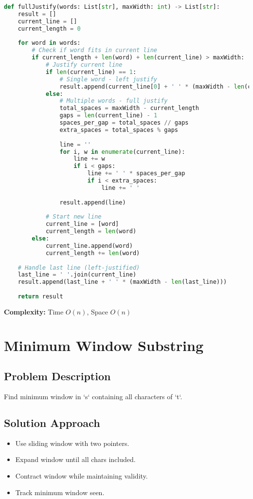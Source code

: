 \documentclass[10pt, a4paper]{article}
\begin{document}
\begin{lstlisting}[language=Python]
def fullJustify(words: List[str], maxWidth: int) -> List[str]:
    result = []
    current_line = []
    current_length = 0
    
    for word in words:
        # Check if word fits in current line
        if current_length + len(word) + len(current_line) > maxWidth:
            # Justify current line
            if len(current_line) == 1:
                # Single word - left justify
                result.append(current_line[0] + ' ' * (maxWidth - len(current_line[0])))
            else:
                # Multiple words - full justify
                total_spaces = maxWidth - current_length
                gaps = len(current_line) - 1
                spaces_per_gap = total_spaces // gaps
                extra_spaces = total_spaces % gaps
                
                line = ''
                for i, w in enumerate(current_line):
                    line += w
                    if i < gaps:
                        line += ' ' * spaces_per_gap
                        if i < extra_spaces:
                            line += ' '
                
                result.append(line)
            
            # Start new line
            current_line = [word]
            current_length = len(word)
        else:
            current_line.append(word)
            current_length += len(word)
    
    # Handle last line (left-justified)
    last_line = ' '.join(current_line)
    result.append(last_line + ' ' * (maxWidth - len(last_line)))
    
    return result
\end{lstlisting}
\textbf{Complexity:} Time $O(n)$, Space $O(n)$

\section{Minimum Window Substring}
\subsection*{Problem Description}
Find minimum window in `s` containing all characters of `t`.

\subsection*{Solution Approach}
\begin{itemize}
    \item Use sliding window with two pointers.
    \item Expand window until all chars included.
    \item Contract window while maintaining validity.
    \item Track minimum window seen.
\end{itemize}
\end{document}
